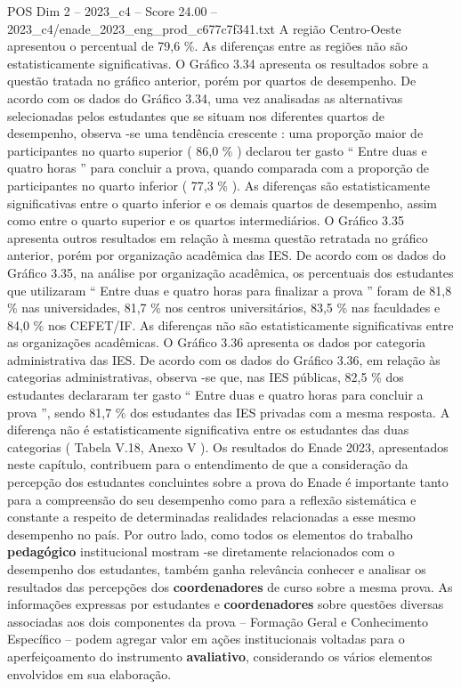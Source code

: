 \begin{textsample}{POS Dim 2 – 2023\_c4 – Score 24.00 – 2023\_c4/enade\_2023\_eng\_prod\_c677c7f341.txt}
A região Centro-Oeste apresentou o percentual de 79,6 \%.
As diferenças entre as regiões não são estatisticamente significativas.
O Gráfico 3.34 apresenta os resultados sobre a questão tratada no gráfico anterior, porém por quartos de desempenho.
De acordo com os dados do Gráfico 3.34, uma vez analisadas as alternativas selecionadas pelos estudantes que se situam nos diferentes quartos de desempenho, observa -se uma tendência crescente : uma proporção maior de participantes no quarto superior ( 86,0 \% ) declarou ter gasto “ Entre duas e quatro horas ” para concluir a prova, quando comparada com a proporção de participantes no quarto inferior ( 77,3 \% ).
As diferenças são estatisticamente significativas entre o quarto inferior e os demais quartos de desempenho, assim como entre o quarto superior e os quartos intermediários.
O Gráfico 3.35 apresenta outros resultados em relação à mesma questão retratada no gráfico anterior, porém por organização acadêmica das IES.
De acordo com os dados do Gráfico 3.35, na análise por organização acadêmica, os percentuais dos estudantes que utilizaram “ Entre duas e quatro horas para finalizar a prova ” foram de 81,8 \% nas universidades, 81,7 \% nos centros universitários, 83,5 \% nas faculdades e 84,0 \% nos CEFET/IF.
As diferenças não são estatisticamente significativas entre as organizações acadêmicas.
O Gráfico 3.36 apresenta os dados por categoria administrativa das IES.
De acordo com os dados do Gráfico 3.36, em relação às categorias administrativas, observa -se que, nas IES públicas, 82,5 \% dos estudantes declararam ter gasto “ Entre duas e quatro horas para concluir a prova ”, sendo 81,7 \% dos estudantes das IES privadas com a mesma resposta.
A diferença não é estatisticamente significativa entre os estudantes das duas categorias ( Tabela V.18, Anexo V ).
Os resultados do Enade 2023, apresentados neste capítulo, contribuem para o entendimento de que a consideração da percepção dos estudantes concluintes sobre a prova do Enade é importante tanto para a compreensão do seu desempenho como para a reflexão sistemática e constante a respeito de determinadas realidades relacionadas a esse mesmo desempenho no país.
Por outro lado, como todos os elementos do trabalho \textbf{pedagógico} institucional mostram -se diretamente relacionados com o desempenho dos estudantes, também ganha relevância conhecer e analisar os resultados das percepções dos \textbf{coordenadores} de curso sobre a mesma prova.
As informações expressas por estudantes e \textbf{coordenadores} sobre questões diversas associadas aos dois componentes da prova – Formação Geral e Conhecimento Específico – podem agregar valor em ações institucionais voltadas para o aperfeiçoamento do instrumento \textbf{avaliativo}, considerando os vários elementos envolvidos em sua elaboração.

\end{textsample}
